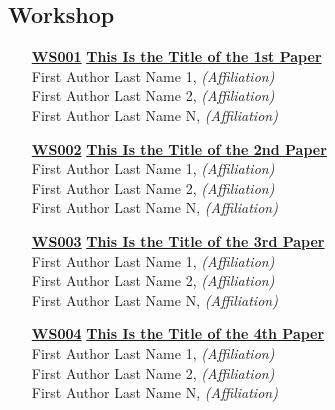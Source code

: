 \subsection{Workshop}
\begin{enumerate}
\item[\href{https://doi.org/10.1145/1122445.1122456}{\textbf{WS001}}]
\href{https://doi.org/10.1145/1122445.1122456}{\textbf{This Is the Title of the 1st Paper}}\\
First Author Last Name 1, \emph{(Affiliation)}\\
First Author Last Name 2, \emph{(Affiliation)}\\
First Author Last Name N, \emph{(Affiliation)}\\

\item[\href{https://doi.org/10.1145/1122445.1122456}{\textbf{WS002}}]
\href{https://doi.org/10.1145/1122445.1122456}{\textbf{This Is the Title of the 2nd Paper}}\\
First Author Last Name 1, \emph{(Affiliation)}\\
First Author Last Name 2, \emph{(Affiliation)}\\
First Author Last Name N, \emph{(Affiliation)}\\

\item[\href{https://doi.org/10.1145/1122445.1122456}{\textbf{WS003}}]
\href{https://doi.org/10.1145/1122445.1122456}{\textbf{This Is the Title of the 3rd Paper}}\\
First Author Last Name 1, \emph{(Affiliation)}\\
First Author Last Name 2, \emph{(Affiliation)}\\
First Author Last Name N, \emph{(Affiliation)}\\

\item[\href{https://doi.org/10.1145/1122445.1122456}{\textbf{WS004}}]
\href{https://doi.org/10.1145/1122445.1122456}{\textbf{This Is the Title of the 4th Paper}}\\
First Author Last Name 1, \emph{(Affiliation)}\\
First Author Last Name 2, \emph{(Affiliation)}\\
First Author Last Name N, \emph{(Affiliation)}\\
\end{enumerate}


